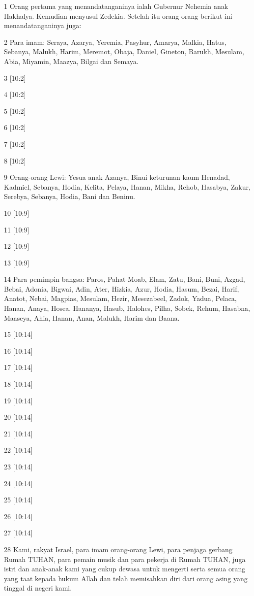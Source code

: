 \par 1 Orang pertama yang menandatanganinya ialah Gubernur Nehemia anak Hakhalya. Kemudian menyusul Zedekia. Setelah itu orang-orang berikut ini menandatanganinya juga:
\par 2 Para imam: Seraya, Azarya, Yeremia, Pasyhur, Amarya, Malkia, Hatus, Sebanya, Malukh, Harim, Meremot, Obaja, Daniel, Gineton, Barukh, Mesulam, Abia, Miyamin, Maazya, Bilgai dan Semaya.
\par 3 [10:2]
\par 4 [10:2]
\par 5 [10:2]
\par 6 [10:2]
\par 7 [10:2]
\par 8 [10:2]
\par 9 Orang-orang Lewi: Yesua anak Azanya, Binui keturunan kaum Henadad, Kadmiel, Sebanya, Hodia, Kelita, Pelaya, Hanan, Mikha, Rehob, Hasabya, Zakur, Serebya, Sebanya, Hodia, Bani dan Beninu.
\par 10 [10:9]
\par 11 [10:9]
\par 12 [10:9]
\par 13 [10:9]
\par 14 Para pemimpin bangsa: Paros, Pahat-Moab, Elam, Zatu, Bani, Buni, Azgad, Bebai, Adonia, Bigwai, Adin, Ater, Hizkia, Azur, Hodia, Hasum, Bezai, Harif, Anatot, Nebai, Magpias, Mesulam, Hezir, Mesezabeel, Zadok, Yadua, Pelaca, Hanan, Anaya, Hosea, Hananya, Hasub, Halohes, Pilha, Sobek, Rehum, Hasabna, Maaseya, Ahia, Hanan, Anan, Malukh, Harim dan Baana.
\par 15 [10:14]
\par 16 [10:14]
\par 17 [10:14]
\par 18 [10:14]
\par 19 [10:14]
\par 20 [10:14]
\par 21 [10:14]
\par 22 [10:14]
\par 23 [10:14]
\par 24 [10:14]
\par 25 [10:14]
\par 26 [10:14]
\par 27 [10:14]
\par 28 Kami, rakyat Israel, para imam orang-orang Lewi, para penjaga gerbang Rumah TUHAN, para pemain musik dan para pekerja di Rumah TUHAN, juga istri dan anak-anak kami yang cukup dewasa untuk mengerti serta semua orang yang taat kepada hukum Allah dan telah memisahkan diri dari orang asing yang tinggal di negeri kami.
